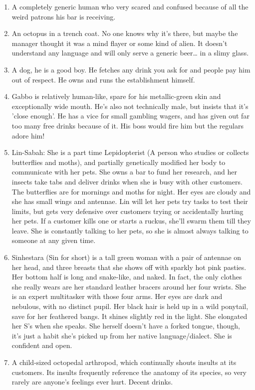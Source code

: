 \documentclass{article}
\begin{document}
\begin{enumerate}
	\item A completely generic human who very scared and confused because of all the weird patrons his bar is receiving.
	\item An octopus in a trench coat. No one knows why it's there, but maybe the manager thought it was a mind flayer or some kind of alien. It doesn't understand any language and will only serve a generic beer… in a slimy glass.
	\item A dog, he is a good boy. He fetches any drink you ask for and people pay him out of respect. He owns and runs the establishment himself.
	\item Gabbo is relatively human-like, spare for his metallic-green skin and exceptionally wide mouth. He's also not technically male, but insists that it's 'close enough'. He has a vice for small gambling wagers, and has given out far too many free drinks because of it. His boss would fire him but the regulars adore him!
	\item Lin-Sabah: She is a part time Lepidopterist (A person who studies or collects butterflies and moths), and partially genetically modified her body to communicate with her pets. She owns a bar to fund her research, and her insects take tabs and deliver drinks when she is busy with other customers. The butterflies are for mornings and moths for night. Her eyes are cloudy and she has small wings and antennae. Lin will let her pets try tasks to test their limits, but gets very defensive over customers trying or accidentally hurting her pets. If a customer kills one or starts a ruckus, she'll swarm them till they leave. She is constantly talking to her pets, so she is almost always talking to someone at any given time.
	\item Sinhestara (Sin for short) is a tall green woman with a pair of antennae on her head, and three breasts that she shows off with sparkly hot pink pasties. Her bottom half is long and snake-like, and naked. In fact, the only clothes she really wears are her standard leather bracers around her four wrists. She is an expert multitasker with those four arms. Her eyes are dark and nebulous, with no distinct pupil. Her black hair is held up in a wild ponytail, save for her feathered bangs. It shines slightly red in the light. She elongated her S's when she speaks. She herself doesn't have a forked tongue, though, it's just a habit she's picked up from her native language/dialect. She is confident and open.
	\item A child-sized octopedal arthropod, which continually shouts insults at its customers. Its insults frequently reference the anatomy of its species, so very rarely are anyone's feelings ever hurt. Decent drinks.

\end{enumerate}
\end{document}

